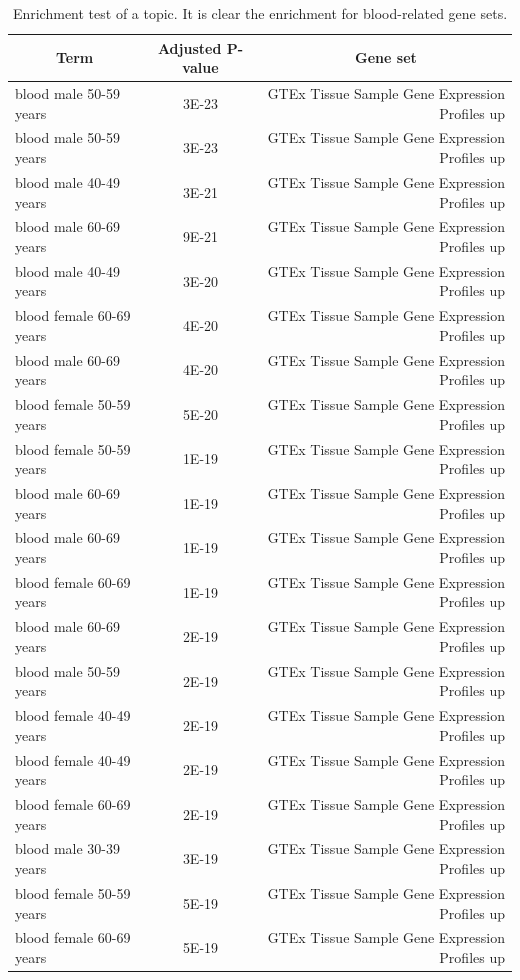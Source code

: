 \begin{table}[htb!]
	\centering
	\tiny
	\begin{tabular}{|l|c|r|}
		\hline
		\multicolumn{1}{|c}{Term} & \multicolumn{1}{|c|}{Adjusted P-value} & \multicolumn{1}{c|}{Gene set} \\ \hline
		blood male 50-59 years & 3E-23 & GTEx Tissue Sample Gene Expression Profiles up \\ \hline
		blood male 50-59 years & 3E-23 & GTEx Tissue Sample Gene Expression Profiles up \\ \hline
		blood male 40-49 years & 3E-21 & GTEx Tissue Sample Gene Expression Profiles up \\ \hline
		blood male 60-69 years & 9E-21 & GTEx Tissue Sample Gene Expression Profiles up \\ \hline
		blood male 40-49 years & 3E-20 & GTEx Tissue Sample Gene Expression Profiles up \\ \hline
		blood female 60-69 years & 4E-20 & GTEx Tissue Sample Gene Expression Profiles up \\ \hline
		blood male 60-69 years & 4E-20 & GTEx Tissue Sample Gene Expression Profiles up \\ \hline
		blood female 50-59 years & 5E-20 & GTEx Tissue Sample Gene Expression Profiles up \\ \hline
		blood female 50-59 years & 1E-19 & GTEx Tissue Sample Gene Expression Profiles up \\ \hline
		blood male 60-69 years & 1E-19 & GTEx Tissue Sample Gene Expression Profiles up \\ \hline
		blood male 60-69 years & 1E-19 & GTEx Tissue Sample Gene Expression Profiles up \\ \hline
		blood female 60-69 years & 1E-19 & GTEx Tissue Sample Gene Expression Profiles up \\ \hline
		blood male 60-69 years & 2E-19 & GTEx Tissue Sample Gene Expression Profiles up \\ \hline
		blood male 50-59 years & 2E-19 & GTEx Tissue Sample Gene Expression Profiles up \\ \hline
		blood female 40-49 years & 2E-19 & GTEx Tissue Sample Gene Expression Profiles up \\ \hline
		blood female 40-49 years & 2E-19 & GTEx Tissue Sample Gene Expression Profiles up \\ \hline
		blood female 60-69 years & 2E-19 & GTEx Tissue Sample Gene Expression Profiles up \\ \hline
		blood male 30-39 years & 3E-19 & GTEx Tissue Sample Gene Expression Profiles up \\ \hline
		blood female 50-59 years & 5E-19 & GTEx Tissue Sample Gene Expression Profiles up \\ \hline
		blood female 60-69 years & 5E-19 & GTEx Tissue Sample Gene Expression Profiles up \\ \hline
	\end{tabular}
	\caption{Enrichment test of a topic. It is clear the enrichment for blood-related gene sets.}
		\label{tab:topic/enrich/blood}
\end{table}
